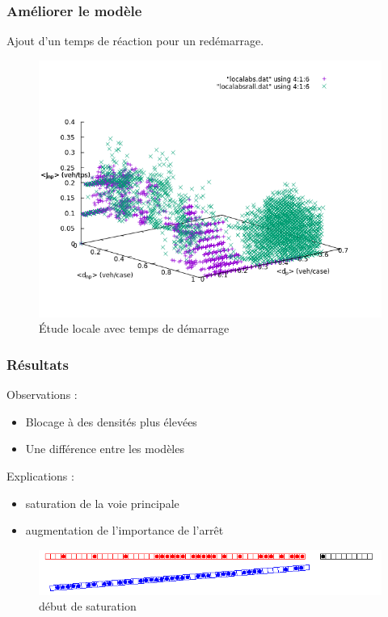 \documentclass[slidetop,11pt]{beamer}
\begin{document}
\begin{frame}
	 \frametitle{Améliorer le modèle}
	 Ajout d'un temps de réaction pour un redémarrage.
	 \begin{figure}
	 	\begin{center}
	 		\includegraphics[scale=0.4]{./diagrammes-fondamentaux/localabs0w1w}
	 	\end{center}
	 	\caption{Étude locale avec temps de démarrage}
	 \end{figure}
\end{frame}

\begin{frame}
	\frametitle{Résultats}
	Observations :
		\begin{itemize}
			 \item Blocage à des densités plus élevées
			 \item Une différence entre les modèles
		\end{itemize}
	Explications :
		\begin{itemize}
			\item saturation de la voie principale
			\item augmentation de l'importance de l’arrêt
		\end{itemize}
	\begin{figure}
		\begin{center}
			\includegraphics[scale=0.4]{./images/localsature}
		\end{center}
		\caption{début de saturation}
	\end{figure}
\end{frame}
	
\end{document}
